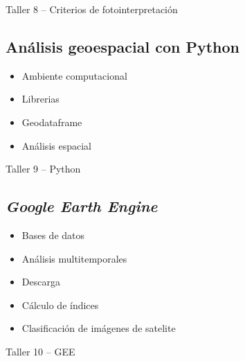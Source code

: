 \documentclass[a4paper,twoside,11pt,]{article}
\begin{document}
\begin{tcolorbox}[enhanced,width=5in,center upper,  fontupper=\large\bfseries,drop shadow southwest,sharp corners]
Taller 8 -- Criterios de fotointerpretación
\end{tcolorbox}

\subsection {Análisis geoespacial con Python}
\begin{itemize}
\item Ambiente computacional
\item Librerias
\item Geodataframe
\item Análisis espacial
\end{itemize}

\begin{tcolorbox}[enhanced,width=5in,center upper,  fontupper=\large\bfseries,drop shadow southwest,sharp corners]
Taller 9 -- Python
\end{tcolorbox}

\subsection {\emph{Google Earth Engine}}
\begin{itemize}
\item Bases de datos
\item Análisis multitemporales
\item Descarga
\item Cálculo de índices
\item Clasificación de imágenes de satelite
\end{itemize}

\begin{tcolorbox}[enhanced,width=5in,center upper,  fontupper=\large\bfseries,drop shadow southwest,sharp corners]
Taller 10 -- GEE
\end{tcolorbox}
\end{document}
